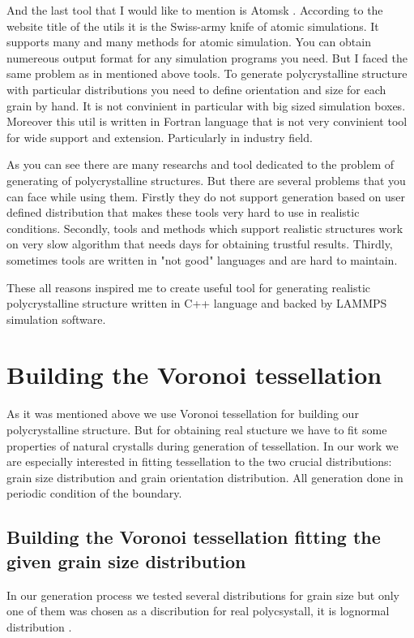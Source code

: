 \documentclass{article}
\begin{document}
And the last tool that I would like to mention is Atomsk \cite{hirel15}. According to the website title of the utils it is the Swiss-army knife of atomic simulations. It supports many and many methods for atomic simulation. You can obtain numereous output format for any simulation programs you need. But I faced the same problem as in mentioned above tools. To generate polycrystalline structure with particular distributions you need to define orientation and size for each grain by hand. It is not convinient in particular with big sized simulation boxes. Moreover this util is written in Fortran language that is not very convinient tool for wide support and extension. Particularly in industry field.

As you can see there are many researchs and tool dedicated to the problem of generating of polycrystalline structures. But there are several problems that you can face while using them. Firstly they do not support generation based on user defined distribution that makes these tools very hard to use in realistic conditions. Secondly, tools and methods which support realistic structures work on very slow algorithm that needs days for obtaining trustful results. Thirdly, sometimes tools are written in "not good" languages and are hard to maintain.

These all reasons inspired me to create useful tool for generating realistic polycrystalline structure written in C++ language and backed by LAMMPS simulation software.

\section{Building the Voronoi tessellation}

As it was mentioned above we use Voronoi tessellation for building our polycrystalline structure. But for obtaining real stucture we have to fit some properties of natural crystalls during generation of tessellation. In our work we are especially interested in fitting tessellation to the two crucial distributions: grain size distribution and grain orientation distribution. All generation done in periodic condition of the boundary.

\subsection{Building the Voronoi tessellation fitting the given grain size distribution}

In our generation process we tested several distributions for grain size but only one of them was chosen as a discribution for real polycsystall, it is lognormal distribution \cite{shen15, liu14}.
\end{document}
